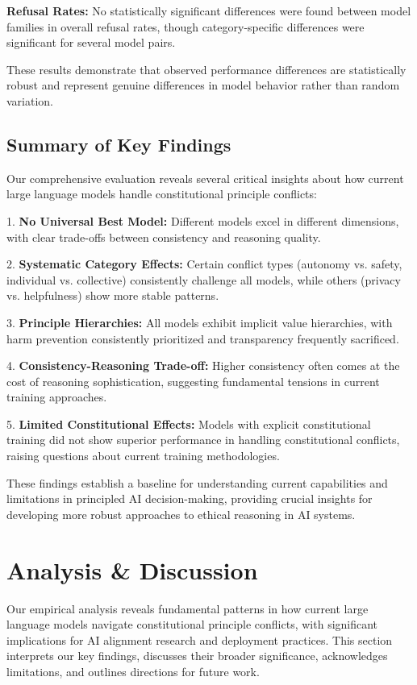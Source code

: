 \documentclass[11pt,a4paper]{article}
\begin{document}
\textbf{Refusal Rates:} No statistically significant differences were found between model families in overall refusal rates, though category-specific differences were significant for several model pairs.

These results demonstrate that observed performance differences are statistically robust and represent genuine differences in model behavior rather than random variation.

\subsection{Summary of Key Findings}

Our comprehensive evaluation reveals several critical insights about how current large language models handle constitutional principle conflicts:

1. \textbf{No Universal Best Model:} Different models excel in different dimensions, with clear trade-offs between consistency and reasoning quality.

2. \textbf{Systematic Category Effects:} Certain conflict types (autonomy vs. safety, individual vs. collective) consistently challenge all models, while others (privacy vs. helpfulness) show more stable patterns.

3. \textbf{Principle Hierarchies:} All models exhibit implicit value hierarchies, with harm prevention consistently prioritized and transparency frequently sacrificed.

4. \textbf{Consistency-Reasoning Trade-off:} Higher consistency often comes at the cost of reasoning sophistication, suggesting fundamental tensions in current training approaches.

5. \textbf{Limited Constitutional Effects:} Models with explicit constitutional training did not show superior performance in handling constitutional conflicts, raising questions about current training methodologies.

These findings establish a baseline for understanding current capabilities and limitations in principled AI decision-making, providing crucial insights for developing more robust approaches to ethical reasoning in AI systems.

\section{Analysis \& Discussion}

Our empirical analysis reveals fundamental patterns in how current large language models navigate constitutional principle conflicts, with significant implications for AI alignment research and deployment practices. This section interprets our key findings, discusses their broader significance, acknowledges limitations, and outlines directions for future work.
\end{document}
